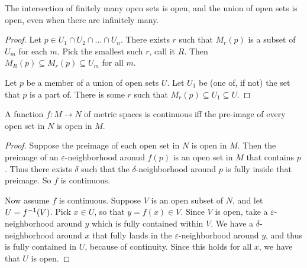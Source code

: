 \documentclass[11pt]{scrreport}
\begin{document}
\begin{proposition}
    The intersection of finitely many open sets is open, and the union of open sets is open, even when there are infinitely many.
\end{proposition}
\begin{proof}
    Let $p\in U_1\cap U_2\cap\dots \cap U_n$. There exists $r$ such that $M_r(p)$ is a subset of $U_m$ for each $m$. Pick the smallest such $r$, call it $R$. Then $M_R(p)\subseteq M_r(p) \subseteq U_m$ for all $m$.

    Let $p$ be a member of a union of open sets $U$. Let $U_1$ be (one of, if not) the set that $p$ is a part of. There is some $r$ such that $M_r(p)\subseteq U_1\subseteq U$.
\end{proof}
\begin{theorem}
    A function $f: M\to N$ of metric spaces is continuous iff the pre-image of every open set in $N$ is open in $M$.
\end{theorem}
\begin{proof}
    Suppose the preimage of each open set in $N$ is open in $M$. Then the preimage of an $\varepsilon$-neighborhood aronud $f(p)$ is an open set in $M$ that contains $p$. Thus there exists $\delta$ such that the $\delta$-neighborhood around $p$ is fully inside that preimage. So $f$ is continuous.

    Now assume $f$ is continuous. Suppose $V$ is an open subset of $N$, and let $U=f^{-1}(V)$. Pick $x\in U$, so that $y = f(x)\in V$. Since $V$ is open, take a $\varepsilon$-neighborhood around $y$ which is fully contained within $V$. We have a $\delta$-neighborhood around $x$ that fully lands in the $\varepsilon$-neighborhood around $y$, and thus is fully contained in $U$, because of continuity. Since this holds for all $x$, we have that $U$ is open.
\end{proof}
\end{document}
